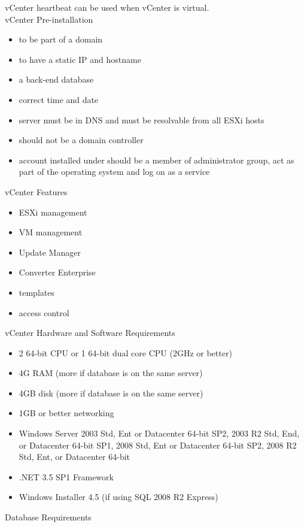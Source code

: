 vCenter heartbeat can be used when vCenter is virtual.\\

vCenter Pre-installation

\begin{itemize}
\item to be part of a domain
\item to have a static IP and hostname
\item a back-end database
\item correct time and date
\item server must be in DNS and must be resolvable from all ESXi hosts
\item should not be a domain controller
\item account installed under should be a member of administrator group, act as
part of the operating system and log on as a service
\end{itemize}

vCenter Features

\begin{itemize}
\item ESXi management
\item VM management
\item Update Manager
\item Converter Enterprise
\item templates
\item access control
\end{itemize}

vCenter Hardware and Software Requirements

\begin{itemize}
\item 2 64-bit CPU or 1 64-bit dual core CPU (2GHz or better)
\item 4G RAM (more if database is on the same server)
\item 4GB disk (more if database is on the same server)
\item 1GB or better networking
\item Windows Server 2003 Std, Ent or Datacenter 64-bit SP2, 2003 R2 Std, End, or Datacenter
64-bit SP1, 2008 Std, Ent or Datacenter 64-bit SP2, 2008 R2 Std, Ent, or Datacenter 64-bit
\item .NET 3.5 SP1 Framework
\item Windows Installer 4.5 (if using SQL 2008 R2 Express)
\end{itemize}

Database Requirements


